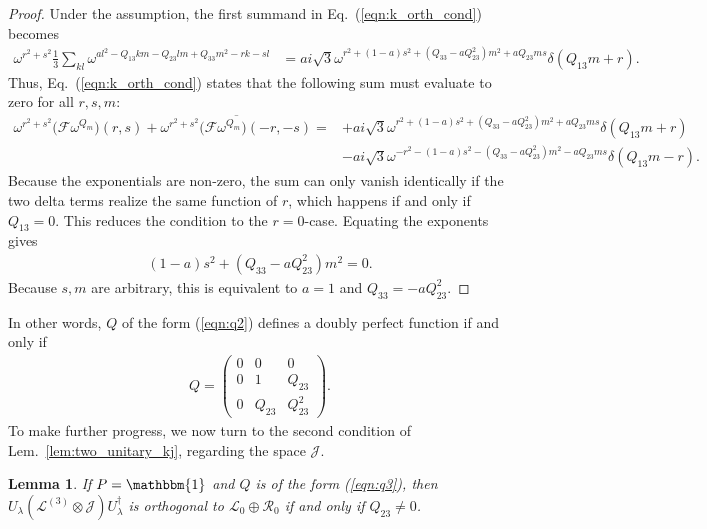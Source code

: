 \documentclass[aps,nofootinbib,floatfix,a4paper]{revtex4}
\newtheorem{lemma}[theorem]{Lemma}
\newcommand{\1}{\mbox{$\mathbf{1}$}}
\def\F{\mathcal{F}}
\def\J{\mathcal{J}}
\def\Id{\mathbbm{1}}
\begin{document}
\begin{proof}
	Under the assumption, the first summand in Eq.~(\ref{eqn:k_orth_cond}) becomes
	\begin{align*}
		\omega^{r^2+s^2}
		\frac13
		\sum_{kl}
		\omega^{a l^2 - Q_{13} k m - Q_{23} l m + Q_{33} m^2 - rk - sl} 
		&=
		a i \sqrt 3
		\omega^{
			r^2+
			(1-a)s^2+
			(Q_{33} -a Q_{23}^2)m^2 
			+a Q_{23} m s
		}
		\delta(Q_{13} m + r)
		.
	\end{align*}
	Thus, Eq.~(\ref{eqn:k_orth_cond}) states that the following sum must evaluate to zero for all $r,s,m$:
	\begin{align*}
			\omega^{r^2+s^2} \big(\F \omega^{Q_m}\big)(r,s) 
			+
			\overline{
				\omega^{r^2+s^2} \big(\F \omega^{Q_m}\big)(-r,-s)  
			} 
		=&+ a i
			\sqrt 3
			\omega^{
				r^2+
				(1-a)s^2+
				(Q_{33} -a Q_{23}^2)m^2 
				+a Q_{23} m  s
			}
			\delta(Q_{13} m + r)\\
			&-a i
			\sqrt 3
			\omega^{
				-r^2
				-(1-a)s^2
				-(Q_{33}-a Q_{23}^2)m^2 
				-a Q_{23} m s
			}
			\delta(Q_{13} m - r).
		\end{align*}
		Because the exponentials are non-zero,
		the sum can only vanish identically if the two delta terms realize the same function of $r$, which happens if and only if $Q_{13}=0$.
		This reduces the condition to the $r=0$-case.
		Equating the exponents gives
		\begin{align*}
				(1-a)s^2
				+(Q_{33} -a Q_{23}^2)m^2 
			=0.
	\end{align*}
	Because $s, m$ are arbitrary, this is equivalent to $a=1$ and $Q_{33}=-aQ_{23}^2$.
\end{proof}

In other words, $Q$ of the form (\ref{eqn:q2}) defines a doubly perfect function if and only if
\begin{align}\label{eqn:q3}
	Q=
	\begin{pmatrix}
		0 & 0 & 0 \\
		0 & 1 & Q_{23} \\
		0 & Q_{23} & Q_{23}^2
	\end{pmatrix}.
\end{align}
To make further progress, we now turn to the second condition of Lem.~\ref{lem:two_unitary_kj}, regarding the space $\J$.

\begin{lemma}\label{lem:j_lemma}
	If
	$P=\Id$
	and $Q$ is of the form (\ref{eqn:q3}), then
	$U_\lambda (\mathcal{L}^{(3)}\otimes \J) U_\lambda^\dagger$ is orthogonal to 
	$\mathcal{L}_0 \oplus \mathcal{R}_0$
	if and only if
	$Q_{23}\neq 0$.
\end{lemma}
\end{document}
